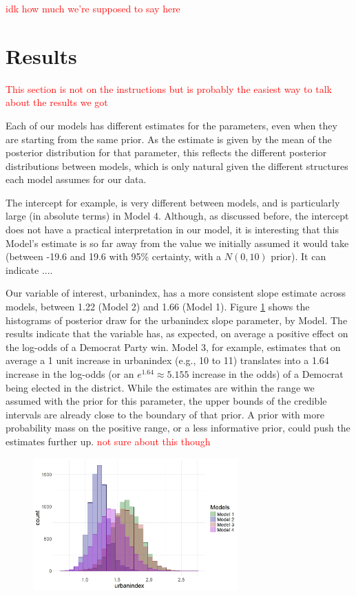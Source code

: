 \documentclass[12pt]{article}
\newcommand{\red}[1]{\textcolor{red}{#1}}
\begin{document}
\red{idk how much we're supposed to say here}



\section{Results}

\textcolor{red}{This section is not on the instructions but is probably the easiest way to talk about the results we got }


Each of our models has different estimates for the parameters, even when they are starting from the same prior.
As the estimate is given by the mean of the posterior distribution for that parameter, this reflects the different posterior distributions between models, which is only natural given the different structures each model assumes for our data.

The intercept for example, is very different between models, and is particularly large (in absolute terms) in Model 4. Although, as discussed before, the intercept does not have a practical interpretation in our model, it is interesting that this Model's estimate is so far away from the value we initially assumed it would take (between -19.6 and 19.6 with 95\% certainty, with a $N(0,10)$ prior). It can indicate ....

Our variable of interest, urbanindex, has a more consistent slope estimate across models, between 1.22 (Model 2) and 1.66 (Model 1).
Figure \ref{fig:urbanindex_estimates} shows the histograms of posterior draw for the urbanindex slope parameter, by Model.
The results indicate that the variable has, as expected, on average a positive effect on the log-odds of a Democrat Party win.
Model 3, for example, estimates that on average a 1 unit increase in urbanindex (e.g., 10 to 11) translates into a 1.64 increase in the log-odds (or an $e^{1.64} \approx 5.155 $ increase in the odds) of a Democrat being elected in the district.
While the estimates are within the range we assumed with the prior for this parameter, the upper bounds of the credible intervals are already close to the boundary of that prior. 
A prior with more probability mass on the positive range, or a less informative prior, could push the estimates further up. \red{not sure about this though}

\begin{figure}
	\centering
	\includegraphics[width=0.7\textwidth]{results/urb_post_all_models.jpeg}
	\caption{}
	\label{fig:urbanindex_estimates}
\end{figure}
\end{document}
